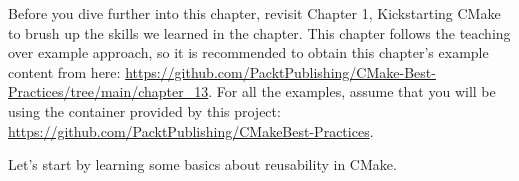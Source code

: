 Before you dive further into this chapter, revisit Chapter 1, Kickstarting CMake to brush up the skills we learned in the chapter. This chapter follows the teaching over example approach, so it is recommended to obtain this chapter's example content from here: \url{https://github.com/PacktPublishing/CMake-Best-Practices/tree/main/chapter\_13}. For all the examples, assume that you will be using the container provided by this project: \url{https://github.com/PacktPublishing/CMakeBest-Practices}.

Let's start by learning some basics about reusability in CMake.